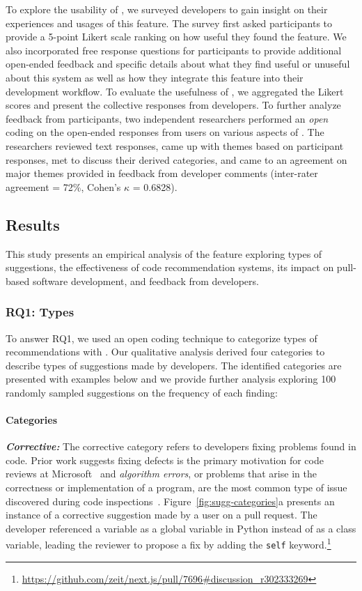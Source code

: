 To explore the usability of \suggs, we surveyed developers to gain insight on their experiences and usages of this feature. The survey first asked participants to provide a 5-point Likert scale ranking on how useful they found the \sugg feature. We also incorporated free response questions for participants to provide additional open-ended feedback and specific details about what they find useful or unuseful about this system as well as how they integrate this feature into their development workflow. To evaluate the usefulness of \sugg, we aggregated the Likert scores and present the collective responses from developers. To further analyze feedback from participants, two independent researchers performed an \textit{open} coding on the open-ended responses from users on various aspects of \suggs. The researchers reviewed text responses, came up with themes based on participant responses, met to discuss their derived categories, and came to an agreement on major themes provided in feedback from developer comments (inter-rater agreement = 72\%, Cohen's $\kappa$ = 0.6828).

\subsection{Results}

This study presents an empirical analysis of the \suggs feature exploring types of suggestions, the effectiveness of code recommendation systems, its impact on pull-based software development, and feedback from developers.

\subsubsection{RQ1: Types}

To answer RQ1, we used an open coding technique to categorize types of recommendations with \suggs. Our qualitative analysis derived four categories to describe types of suggestions made by developers. The identified categories are presented with examples below and we provide further analysis exploring 100 randomly sampled suggestions on the frequency of each finding:

\paragraph{Categories} 


\hspace{\parindent}\textbf{\textit{Corrective:}} The corrective category refers to developers fixing problems found in code. Prior work suggests fixing defects is the primary motivation for code reviews at Microsoft~\cite{bacchelli2013expectations} and \textit{algorithm errors}, or problems that arise in the correctness or implementation of a program, are the most common type of issue discovered during code inspections~\cite{chillarege1992orthogonal}. Figure~\ref{fig:sugg-categories}a presents an instance of a corrective suggestion made by a user on a pull request. The developer referenced a variable as a global variable in Python instead of as a class variable, leading the reviewer to propose a fix by adding the \texttt{self} keyword.\footnote{\url{https://github.com/zeit/next.js/pull/7696\#discussion_r302333269}}

